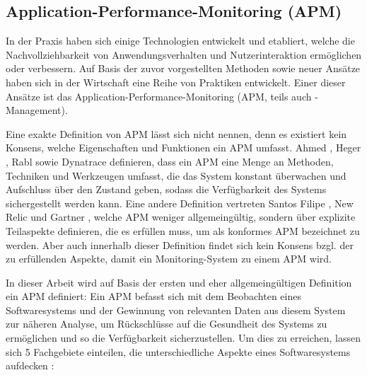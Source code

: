 

\subsection{Application-Performance-Monitoring (APM)}

In der Praxis haben sich einige Technologien entwickelt und etabliert, welche die Nachvollziehbarkeit von Anwendungsverhalten und Nutzerinteraktion ermöglichen oder verbessern. Auf Basis der zuvor vorgestellten Methoden sowie neuer Ansätze haben sich in der Wirtschaft eine Reihe von Praktiken entwickelt. Einer dieser Ansätze ist das Application-Performance-Monitoring (APM, teils auch -Management).

Eine exakte Definition von APM lässt sich nicht nennen, denn es existiert kein Konsens, welche Eigenschaften und Funktionen ein APM umfasst. Ahmed \etal \cite{StudyingTheEffectivenessOfAPMTools}, Heger \etal \cite{APMStateOfTheArtAndChallenges}, Rabl \etal \cite{SolvingBigDataChallengesForAPM} sowie Dynatrace \cite{DynatraceAPM} definieren, dass ein APM eine Menge an Methoden, Techniken und Werkzeugen umfasst, die das System konstant überwachen und Aufschluss über den Zustand geben, sodass die Verfügbarkeit des Systems sichergestellt werden kann. Eine andere Definition vertreten Santos Filipe \cite{ClientSideMonitoringOfDistributedSystems}, New Relic \cite{NewRelicAPM} und Gartner \cite{GartnerMagicQuadrantForAPM}, welche APM weniger allgemeingültig, sondern über explizite Teilaspekte definieren, die es erfüllen muss, um als konformes APM bezeichnet zu werden. Aber auch innerhalb dieser Definition findet sich kein Konsens bzgl. der zu erfüllenden Aspekte, damit ein Monitoring-System zu einem APM wird.

In dieser Arbeit wird auf Basis der ersten und eher allgemeingültigen Definition ein APM definiert: Ein APM befasst sich mit dem Beobachten eines Softwaresystems und der Gewinnung von relevanten Daten aus diesem System zur näheren Analyse, um Rückschlüsse auf die Gesundheit des Systems zu ermöglichen und so die Verfügbarkeit sicherzustellen. Um dies zu erreichen, lassen sich 5 Fachgebiete einteilen, die unterschiedliche Aspekte eines Softwaresystems aufdecken \cite{ASurveyOfCloudMonitoringTools} \cite{GartnerMagicQuadrantForAPM} \cite{ResearchAndApplicationOfOperatingMonitoring}:

